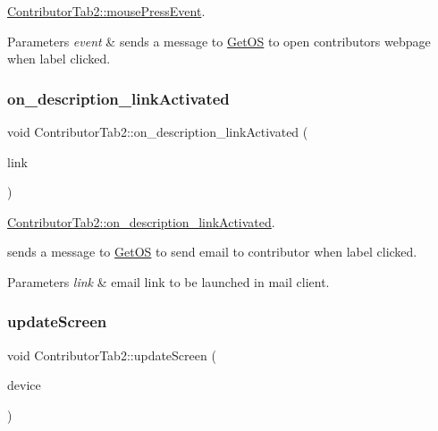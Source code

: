 \hyperlink{classContributorTab2_a93c3ed51e9f40c439ed4182e4407434a}{Contributor\+Tab2\+::mouse\+Press\+Event}. 


\begin{DoxyParams}{Parameters}
{\em event} & sends a message to \hyperlink{classGetOS}{Get\+OS} to open contributors webpage when label clicked. \\
\hline
\end{DoxyParams}
\mbox{\label{classContributorTab2_a22fb06bbd151a407ff40404897cabb4d}} 
\subsubsection{\texorpdfstring{on\+\_\+description\+\_\+link\+Activated}{on\_description\_linkActivated}}
{\footnotesize\ttfamily void Contributor\+Tab2\+::on\+\_\+description\+\_\+link\+Activated (\begin{DoxyParamCaption}\item[{const Q\+String \&}]{link }\end{DoxyParamCaption})\hspace{0.3cm}{\ttfamily [slot]}}



\hyperlink{classContributorTab2_a22fb06bbd151a407ff40404897cabb4d}{Contributor\+Tab2\+::on\+\_\+description\+\_\+link\+Activated}. 

sends a message to \hyperlink{classGetOS}{Get\+OS} to send email to contributor when label clicked. 
\begin{DoxyParams}{Parameters}
{\em link} & email link to be launched in mail client. \\
\hline
\end{DoxyParams}
\mbox{\label{classContributorTab2_abf252c3c3cacdc4a4d1f369ffd4fbb99}} 
\subsubsection{\texorpdfstring{update\+Screen}{updateScreen}}
{\footnotesize\ttfamily void Contributor\+Tab2\+::update\+Screen (\begin{DoxyParamCaption}\item[{\hyperlink{classDevice}{Device}}]{device }\end{DoxyParamCaption})\hspace{0.3cm}{\ttfamily [slot]}}




